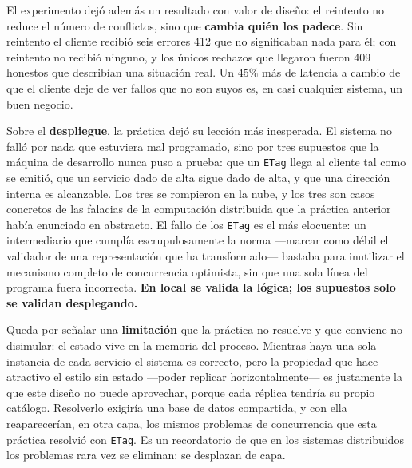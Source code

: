 \documentclass[12pt]{article}
\begin{document}
El experimento dejó además un resultado con valor de diseño: el reintento no reduce el número de conflictos, sino que \textbf{cambia quién los padece}. Sin reintento el cliente recibió seis errores 412 que no significaban nada para él; con reintento no recibió ninguno, y los únicos rechazos que llegaron fueron 409 honestos que describían una situación real. Un $45\%$ más de latencia a cambio de que el cliente deje de ver fallos que no son suyos es, en casi cualquier sistema, un buen negocio.

Sobre el \textbf{despliegue}, la práctica dejó su lección más inesperada. El sistema no falló por nada que estuviera mal programado, sino por tres supuestos que la máquina de desarrollo nunca puso a prueba: que un \texttt{ETag} llega al cliente tal como se emitió, que un servicio dado de alta sigue dado de alta, y que una dirección interna es alcanzable. Los tres se rompieron en la nube, y los tres son casos concretos de las falacias de la computación distribuida que la práctica anterior había enunciado en abstracto. El fallo de los \texttt{ETag} es el más elocuente: un intermediario que cumplía escrupulosamente la norma —marcar como débil el validador de una representación que ha transformado— bastaba para inutilizar el mecanismo completo de concurrencia optimista, sin que una sola línea del programa fuera incorrecta. \textbf{En local se valida la lógica; los supuestos solo se validan desplegando.}

Queda por señalar una \textbf{limitación} que la práctica no resuelve y que conviene no disimular: el estado vive en la memoria del proceso. Mientras haya una sola instancia de cada servicio el sistema es correcto, pero la propiedad que hace atractivo el estilo sin estado —poder replicar horizontalmente— es justamente la que este diseño no puede aprovechar, porque cada réplica tendría su propio catálogo. Resolverlo exigiría una base de datos compartida, y con ella reaparecerían, en otra capa, los mismos problemas de concurrencia que esta práctica resolvió con \texttt{ETag}. Es un recordatorio de que en los sistemas distribuidos los problemas rara vez se eliminan: se desplazan de capa.
\end{document}
